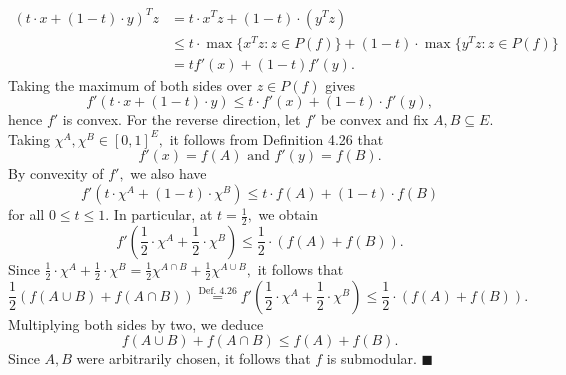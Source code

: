 \documentclass{article}
\begin{document}
\begin{enumerate}
          \begin{align*}
              \left(t\cdot x+(1-t)\cdot y\right)^Tz & = t\cdot x^Tz+(1-t)\cdot (y^Tz) \\ & \leq t\cdot \max\{x^Tz : z \in P(f) \} + (1-t)\cdot \max\{y^Tz : z \in P(f) \} \\& = tf'(x)+(1-t)f'(y).
          \end{align*}Taking the maximum of both sides over $z\in P(f)$ gives
          $$f'(t\cdot x+(1-t)\cdot y)\leq t\cdot f'(x)+(1-t)\cdot f'(y),$$hence $f'$ is convex. For the reverse direction, let $f'$ be convex and fix $A,B\subseteq E.$ Taking $\chi^A,\chi^B\in [0,1]^E,$ it follows from Definition 4.26 that $$f'(x)=f(A) \text{ and } f'(y)=f(B).$$By convexity of $f',$ we also have
          $$f'(t\cdot \chi^A+(1-t)\cdot \chi^B)\leq t\cdot f(A)+(1-t)\cdot f(B)$$for all $0\leq t\leq 1.$ In particular, at $t=\frac{1}{2},$ we obtain
          $$f'\left(\frac{1}{2}\cdot \chi^A+\frac{1}{2}\cdot \chi^B\right)\leq \frac{1}{2}\cdot \left(f(A)+f(B)\right).$$Since $\frac{1}{2}\cdot \chi^A+\frac{1}{2}\cdot \chi^B=\frac{1}{2}\chi^{A\cap B}+\frac{1}{2}\chi^{A\cup B},$ it follows that
          $$\frac{1}{2}\left(f(A\cup B)+f(A\cap B)\right)\overset{\text{Def. }4.26}{=}f'\left(\frac{1}{2}\cdot \chi^A+\frac{1}{2}\cdot \chi^B\right)\leq \frac{1}{2}\cdot \left(f(A)+f(B)\right).$$Multiplying both sides by two, we deduce
          $$f(A\cup B)+f(A\cap B)\leq f(A)+f(B).$$Since $A,B$ were arbitrarily chosen, it follows that $f$ is submodular. $\blacksquare$
      \end{enumerate}
\end{document}
